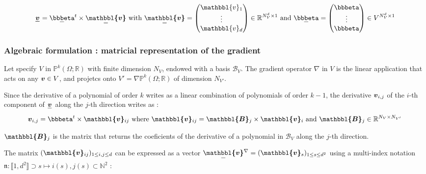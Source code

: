 \documentclass[fleqn]{article}
\begin{document}
        \begin{equation*}
          \tensori{v} = \tensori{\bbbeta} \supscript{t} \times \tensori{\mathbbl{v}}
          \mbox{ with }
          \tensori{\mathbbl{v}} = 
          \begin{pmatrix}
            \mathbbl{v}\subscript{1} \\ \vdots \\ \mathbbl{v}\subscript{d}
          \end{pmatrix} \in \mathbb{R}^{N_V^d \times 1}
          \mbox{ and }
          \tensori{\bbbeta} = 
          \begin{pmatrix}
            \bbbeta \\ \vdots \\ \bbbeta
          \end{pmatrix} \in V^{N_V^d \times 1}
        \end{equation*}

      \subsubsection{Algebraic formulation : matricial representation of the gradient}

        Let specify $V$ in $\mathbb{P}^k(\Omega;\mathbb{R})$ with finite dimension $N_V$, endowed with a basis $\mathcal{B}_V$. The gradient operator $\nabla$ in $V$ is the linear application that acts on any $\bm{v} \in V$, and projetcs onto $V' = \nabla \mathbb{P}^k(\Omega;\mathbb{R})$ of dimension $N_{V'}$.
        \par
        Since the derivative of a polynomial of order $k$ writes as a linear combination of polynomials of order $k-1$, the derivative $\bm{v}{}_{i,j}$ of the $i$-th component of $\tensori{v}$ along the $j$-th direction writes as :
        \begin{equation*}
          \tensoro{v}\subscript{i,j} = \tensoro{\bbbeta}\supscript{t} \times \tensoro{\mathbbl{v}}\subscript{ij}
          \mbox{ where }
          \tensoro{\mathbbl{v}}\subscript{ij} = \tensoro{\mathbbl{B}}\subscript{j} \times \tensoro{\mathbbl{v}}\subscript{i}
          \mbox{ and }
          \tensoro{\mathbbl{B}}\subscript{j} \in \mathbb{R}^{N_V \times N_{V'}}
        \end{equation*}

        $\tensoro{\mathbbl{B}}\subscript{j}$ is the matrix that returns the coeficients of the derivative of a polynomial in $\mathcal{B}_V$ along the $j$-th direction.
        \par
        The matrix $(\tensoro{\mathbbl{v}}\subscript{ij})\subscript{1 \leq i,j \leq d}$ can be expressed as a vector $\tensori{\mathbbl{v}}\supscript{\nabla} = (\tensoro{\mathbbl{v}}\subscript{s})\subscript{1 \leq s \leq d^2}$ using a multi-index notation $\mathfrak{n} : \llbracket 1,d^2 \rrbracket \supset s \mapsto i(s), j(s) \subset \mathbb{N}^2$ :
\end{document}
